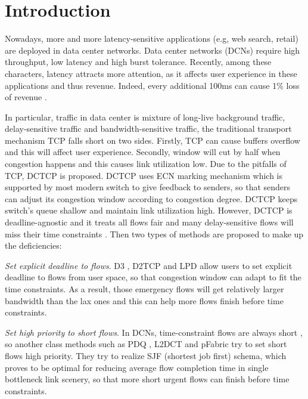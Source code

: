 \documentclass[10pt, conference, letterpaper]{IEEEtran}
\begin{document}
\section{Introduction} \label{Introduction}
Nowadays, more and more latency-sensitive applications (e.g, web search, retail) are deployed in data center networks.  
Data center networks (DCNs) require
high throughput, low latency and high burst tolerance\cite{guo2014traffic}\cite{LPD}\cite{zhang2015towards}. Recently, among these characters, 
latency attracts more attention, as it affects user experience in these applications and thus revenue.
Indeed, every additional 100ms can cause 1\% loss of revenue \cite{DCTCP}.

In particular, traffic in data center is mixture of  
long-live background traffic, delay-sensitive traffic and bandwidth-sensitive traffic, the traditional transport mechanism TCP falls short on two sides.
Firstly, TCP can cause buffers overflow and this will affect user experience.
Secondly, window will cut by half when congestion happens and this causes 
link utilization low.  Due to the pitfalls of TCP, DCTCP\cite{DCTCP} is proposed. DCTCP uses ECN marking mechanism\cite{DCTCP} which is supported by most modern switch to give feedback to senders, so that
senders can adjust its congestion window according to congestion degree. 
DCTCP keeps switch's queue shallow and maintain link utilization high.
However, DCTCP is deadline-agnostic and it treats all flows fair and many delay-sensitive flows will miss their time constraints \cite{D3}\cite{D2TCP}.
Then two types of methods are proposed to make up the deficiencies:

\emph{Set explicit deadline to flows}. 
D3 \cite{D3}, D2TCP \cite{D2TCP} and LPD \cite{LPD} allow users to set explicit deadline to flows from
user space, so that congestion window can adapt to fit the time constraints. 
As a result, those emergency flows will get relatively larger bandwidth than the lax 
ones and this can help more flows finish before time constraints.

\emph{Set high priority to short flows}.  
In DCNs, time-constraint flows are always short \cite{PDQ}, so another class methods
such as PDQ \cite{PDQ}, L2DCT \cite{L2DCT} and pFabric \cite{pFabric} try to set short flows high priority. 
They try to realize SJF (shortest job first) schema, 
which proves to be optimal for reducing average flow completion time in single bottleneck link scenery, 
so that more short urgent flows can finish before time constraints.
\end{document}
